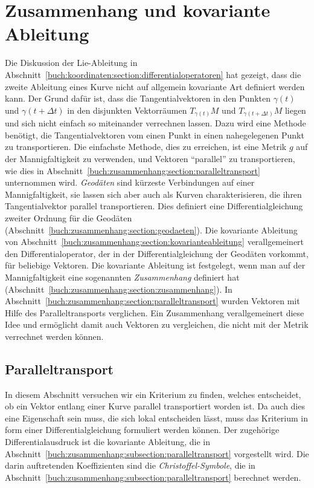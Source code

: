 %
%
%
\chapter{Zusammenhang und kovariante Ableitung
\label{chapter:zusammenhang}}

\noindent
Die Diskussion der Lie-Ableitung in
Abschnitt~\ref{buch:koordinaten:section:differentialoperatoren}
hat gezeigt, dass die zweite Ableitung eines Kurve nicht auf
allgemein kovariante Art definiert werden kann.
Der Grund dafür ist, dass die Tangentialvektoren in den Punkten
$\gamma(t)$ und $\gamma(t+\Delta t)$ in den disjunkten Vektorräumen
$T_{\gamma(t)}M$ und $T_{\gamma(t+\Delta t)}M$ liegen und sich nicht
einfach so miteinander verrechnen lassen.
Dazu wird eine Methode benötigt, die Tangentialvektoren vom einen
Punkt in einen nahegelegenen Punkt zu transportieren.
Die einfachste Methode, dies zu erreichen, ist eine Metrik $g$ auf der
Mannigfaltigkeit zu verwenden, und Vektoren ``parallel'' zu transportieren,
wie dies in Abschnitt~\ref{buch:zusammenhang:section:paralleltransport}
unternommen wird.
{\em Geodäten} sind kürzeste Verbindungen auf einer Mannigfaltigkeit, sie
lassen sich aber auch als Kurven charakterisieren, die ihren Tangentialvektor
parallel transportieren.
%
Dies definiert eine Differentialgleichung zweiter Ordnung für die
Geodäten (Abschnitt~\ref{buch:zusammenhang:section:geodaeten}).
Die kovariante Ableitung von
Abschnitt~\ref{buch:zusammenhang:section:kovarianteableitung}
verallgemeinert den Differentialoperator, der in der Differentialgleichung
der Geodäten vorkommt, für beliebige Vektoren.
Die kovariante Ableitung ist festgelegt, wenn man auf der Mannigfaltigkeit
eine sogenannten {\em Zusammenhang} definiert hat
(Abschnitt~\ref{buch:zusammenhang:section:zusammenhang}). 
%
In Abschnitt~\ref{buch:zusammenhang:section:paralleltransport} wurden
Vektoren mit Hilfe des Paralleltransports verglichen.
Ein Zusammenhang verallgemeinert diese Idee und ermöglicht damit auch
Vektoren zu vergleichen, die nicht mit der Metrik verrechnet werden
können.

%
%
\section{Paralleltransport
\label{buch:zusammenhang:section:paralleltransport}}
In diesem Abschnitt versuchen wir ein Kriterium zu finden, welches
entscheidet, ob ein Vektor entlang einer Kurve parallel transportiert
worden ist.
Da auch dies eine Eigenschaft sein muss, die sich lokal entscheiden
lässt, muss das Kriterium in form einer Differentialgleichung
formuliert werden können.
Der zugehörige Differentialausdruck ist die kovariante Ableitung,
die in Abschnitt~\ref{buch:zusammenhang:subsection:paralleltransport}
vorgestellt wird.
Die darin auftretenden Koeffizienten sind die {\em Christoffel-Symbole},
die in Abschnitt~\ref{buch:zusammenhang:subsection:paralleltransport}
berechnet werden.

